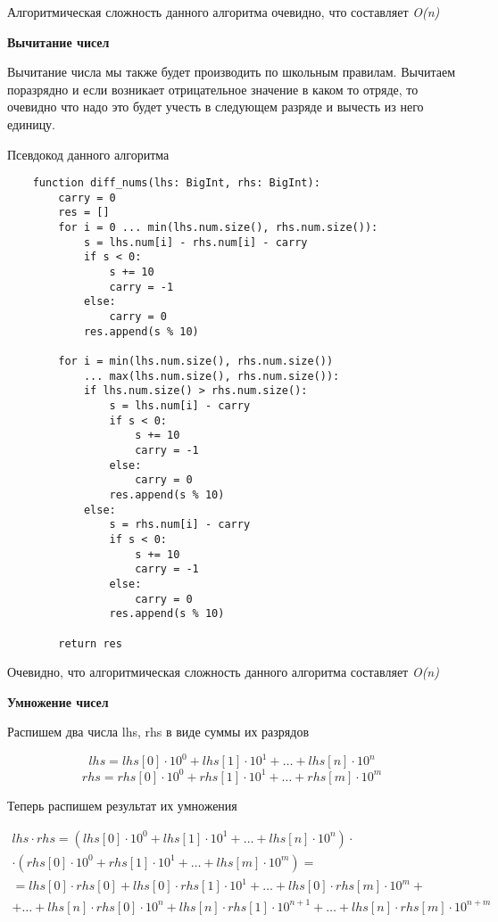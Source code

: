 \documentclass[a4paper,article,14pt]{extarticle}
\begin{document}
Алгоритмическая сложность данного алгоритма очевидно, что составляет \emph{O(n)}

\textbf{Вычитание чисел}

Вычитание числа мы также будет производить по школьным правилам. Вычитаем поразрядно и если возникает
отрицательное значение в каком то отряде, то очевидно что надо это будет учесть в следующем разряде и вычесть 
из него единицу.

Псевдокод данного алгоритма

\begin{lstlisting}
    function diff_nums(lhs: BigInt, rhs: BigInt):
        carry = 0
        res = []
        for i = 0 ... min(lhs.num.size(), rhs.num.size()):
            s = lhs.num[i] - rhs.num[i] - carry
            if s < 0:
                s += 10
                carry = -1
            else:
                carry = 0
            res.append(s % 10)
        
        for i = min(lhs.num.size(), rhs.num.size()) 
            ... max(lhs.num.size(), rhs.num.size()):
            if lhs.num.size() > rhs.num.size():
                s = lhs.num[i] - carry
                if s < 0:
                    s += 10
                    carry = -1
                else:
                    carry = 0
                res.append(s % 10)
            else:
                s = rhs.num[i] - carry
                if s < 0:
                    s += 10
                    carry = -1
                else:
                    carry = 0
                res.append(s % 10)

        return res
\end{lstlisting}


Очевидно, что алгоритмическая сложность данного алгоритма составляет \emph{O(n)}

\textbf{Умножение чисел}

Распишем два числа lhs, rhs в виде суммы их разрядов

\begin{equation}
    lhs = lhs[0] \cdot 10^0 + lhs[1] \cdot 10^1 + \dots + lhs[n] \cdot 10^n
\end{equation}
\begin{equation}
    rhs = rhs[0] \cdot 10^0 + rhs[1] \cdot 10^1 + \dots + rhs[m] \cdot 10^m
\end{equation}

Теперь распишем результат их умножения

\begin{equation}
    \begin{split}
        lhs \cdot rhs = \left(lhs[0] \cdot 10^0 + lhs[1] \cdot 10^1 + \dots + lhs[n] \cdot 10^n \right) \cdot \\
        \cdot \left(rhs[0] \cdot 10^0 + rhs[1] \cdot 10^1 + \dots + lhs[m] \cdot 10^m \right) = \\
        = lhs[0] \cdot rhs[0] + lhs[0] \cdot rhs[1] \cdot 10^1  + \dots + lhs[0] \cdot rhs[m] \cdot 10^m  + \\
        + \dots + lhs[n] \cdot rhs[0] \cdot 10^n + lhs[n] \cdot rhs[1] \cdot 10 ^ {n + 1} + \dots + lhs[n] \cdot rhs[m] \cdot 10 ^ {n + m}
    \end{split}
\end{equation}
\end{document}
